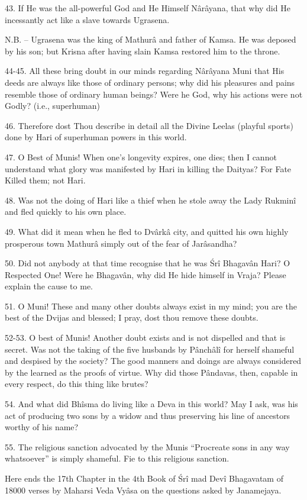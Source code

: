 43. If He was the all-powerful God and He Himself N\^ar\^ayana, that why did He incessantly act like a slave towards Ugrasena.

N.B. -- Ugrasena was the king of Mathur\^a and father of Kamsa. He was deposed by his son; but Krisna after having slain Kamsa restored him to the throne.

44-45. All these bring doubt in our minds regarding N\^ar\^ayana Muni that His deeds are always like those of ordinary persons; why did his pleasures and pains resemble those of ordinary human beings? Were he God, why his actions were not Godly? (i.e., superhuman)

46. Therefore dost Thou describe in detail all the Divine Leelas (playful sports) done by Hari of superhuman powers in this world.

47. O Best of Munis! When one's longevity expires, one dies; then I cannot understand what glory was manifested by Hari in killing the Daityas? For Fate Killed them; not Hari.

48. Was not the doing of Hari like a thief when he stole away the Lady Rukmin\^i and fled quickly to his own place.

49. What did it mean when he fled to Dv\^ark\^a city, and quitted his own highly prosperous town Mathur\^a simply out of the fear of Jar\^asandha?

50. Did not anybody at that time recognise that he was \'Sr\^i Bhagav\^an Hari? O Respected One! Were he Bhagav\^an, why did He hide himself in Vraja? Please explain the cause to me.

51. O Muni! These and many other doubts always exist in my mind; you are the best of the Dvijas and blessed; I pray, dost thou remove these doubts.

52-53. O best of Munis! Another doubt exists and is not dispelled and that is secret. Was not the taking of the five husbands by P\^anch\^al\^i for herself shameful and despised by the society? The good manners and doings are always considered by the learned as the proofs of virtue. Why did those P\^andavas, then, capable in every respect, do this thing like brutes?

54. And what did Bh\^isma do living like a Deva in this world? May I ask, was his act of producing two sons by a widow and thus preserving his line of ancestors worthy of his name?

55. The religious sanction advocated by the Munis ``Procreate sons in any way whatsoever'' is simply shameful. Fie to this religious sanction.

Here ends the 17th Chapter in the 4th Book of \'Sr\^i mad Dev\^i Bhagavatam of 18000 verses by Maharsi Veda Vy\^asa on the questions asked by Janamejaya.

